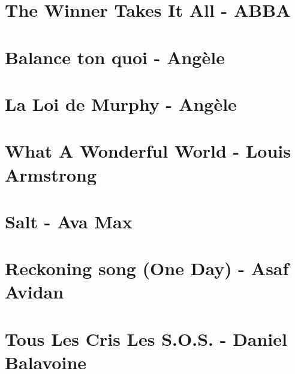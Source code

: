 \documentclass{guitartabs}
\begin{document}
\linespread{0.3}
\tableofcontents
\newpage

\linespread{1}

\section{The Winner Takes It All - ABBA}
\begin{guitar}

\end{guitar}

\section{Balance ton quoi - Angèle}
\begin{guitar}

\end{guitar}

\section{La Loi de Murphy - Angèle}
\begin{guitar}

\end{guitar}


\section*{What A Wonderful World - Louis Armstrong}
\begin{guitar}

\end{guitar}

\section{Salt - Ava Max}
\begin{guitar}

\end{guitar}

\section{Reckoning song (One Day) - Asaf Avidan}
\begin{guitar}

\end{guitar}


\section{Tous Les Cris Les S.O.S. - Daniel Balavoine}
\begin{guitar}

\end{guitar}
\end{document}
